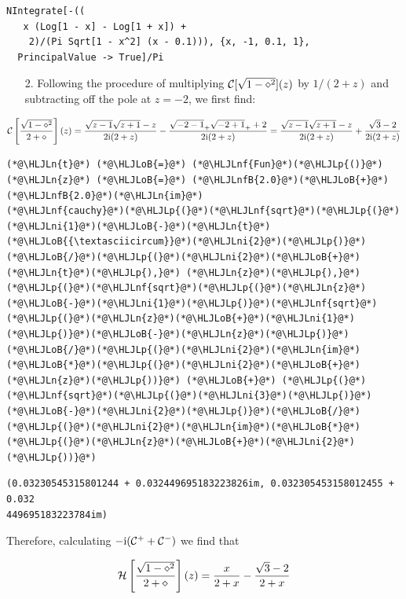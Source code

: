 \documentclass[12pt,a4paper]{article}
\newcommand{\HLJLn}[1]{#1}
\newcommand{\HLJLnf}[1]{\textcolor[RGB]{66,102,213}{#1}}
\newcommand{\HLJLnfB}[1]{\textcolor[RGB]{59,151,46}{#1}}
\newcommand{\HLJLni}[1]{\textcolor[RGB]{59,151,46}{#1}}
\newcommand{\HLJLoB}[1]{\textcolor[RGB]{102,102,102}{\textbf{#1}}}
\newcommand{\HLJLp}[1]{#1}
\def\I{ {\rm i} }
\def\CC{ {\cal C} }
\def\HH{ {\cal H} }
\begin{document}
\begin{verbatim}
NIntegrate[-((
   x (Log[1 - x] - Log[1 + x]) + 
    2)/(Pi Sqrt[1 - x^2] (x - 0.1))), {x, -1, 0.1, 1}, 
  PrincipalValue -> True]/Pi
\end{verbatim}
\begin{itemize}
\item[2. ] Following the procedure of multiplying $\CC[\sqrt{1-\diamond^2}](z)$ by $1/(2+z)$ and subtracting off the pole at $z=-2$, we first find:

\end{itemize}
\[
\CC\left[{\sqrt{1-\diamond^2} \over 2+\diamond}\right](z) = {\sqrt{z-1}\sqrt{z+1} - z \over 2\I(2+z)} -{\sqrt{-2-1}_+ \sqrt{-2+1}_+ +2 \over 2\I(2+z)} = {\sqrt{z-1}\sqrt{z+1} - z \over 2\I(2+z)} +{ \sqrt{3} -2 \over 2\I(2+z)} 
\]

\begin{lstlisting}
(*@\HLJLn{t}@*) (*@\HLJLoB{=}@*) (*@\HLJLnf{Fun}@*)(*@\HLJLp{()}@*)
(*@\HLJLn{z}@*) (*@\HLJLoB{=}@*) (*@\HLJLnfB{2.0}@*)(*@\HLJLoB{+}@*)(*@\HLJLnfB{2.0}@*)(*@\HLJLn{im}@*)
(*@\HLJLnf{cauchy}@*)(*@\HLJLp{(}@*)(*@\HLJLnf{sqrt}@*)(*@\HLJLp{(}@*)(*@\HLJLni{1}@*)(*@\HLJLoB{-}@*)(*@\HLJLn{t}@*)(*@\HLJLoB{{\textasciicircum}}@*)(*@\HLJLni{2}@*)(*@\HLJLp{)}@*)(*@\HLJLoB{/}@*)(*@\HLJLp{(}@*)(*@\HLJLni{2}@*)(*@\HLJLoB{+}@*)(*@\HLJLn{t}@*)(*@\HLJLp{),}@*) (*@\HLJLn{z}@*)(*@\HLJLp{),}@*) (*@\HLJLp{(}@*)(*@\HLJLnf{sqrt}@*)(*@\HLJLp{(}@*)(*@\HLJLn{z}@*)(*@\HLJLoB{-}@*)(*@\HLJLni{1}@*)(*@\HLJLp{)}@*)(*@\HLJLnf{sqrt}@*)(*@\HLJLp{(}@*)(*@\HLJLn{z}@*)(*@\HLJLoB{+}@*)(*@\HLJLni{1}@*)(*@\HLJLp{)}@*)(*@\HLJLoB{-}@*)(*@\HLJLn{z}@*)(*@\HLJLp{)}@*)(*@\HLJLoB{/}@*)(*@\HLJLp{(}@*)(*@\HLJLni{2}@*)(*@\HLJLn{im}@*)(*@\HLJLoB{*}@*)(*@\HLJLp{(}@*)(*@\HLJLni{2}@*)(*@\HLJLoB{+}@*)(*@\HLJLn{z}@*)(*@\HLJLp{))}@*) (*@\HLJLoB{+}@*) (*@\HLJLp{(}@*)(*@\HLJLnf{sqrt}@*)(*@\HLJLp{(}@*)(*@\HLJLni{3}@*)(*@\HLJLp{)}@*)(*@\HLJLoB{-}@*)(*@\HLJLni{2}@*)(*@\HLJLp{)}@*)(*@\HLJLoB{/}@*)(*@\HLJLp{(}@*)(*@\HLJLni{2}@*)(*@\HLJLn{im}@*)(*@\HLJLoB{*}@*)(*@\HLJLp{(}@*)(*@\HLJLn{z}@*)(*@\HLJLoB{+}@*)(*@\HLJLni{2}@*)(*@\HLJLp{))}@*)
\end{lstlisting}

\begin{lstlisting}
(0.03230545315801244 + 0.032449695183223826im, 0.032305453158012455 + 0.032
449695183223784im)
\end{lstlisting}


Therefore, calculating $-\I(\CC^+ + \CC^-)$ we find that

\[
\HH\left[{\sqrt{1-\diamond^2} \over 2+\diamond}\right](z) = {x\over 2+x} -{ \sqrt{3} -2 \over 2+x} 
\]
\end{document}
